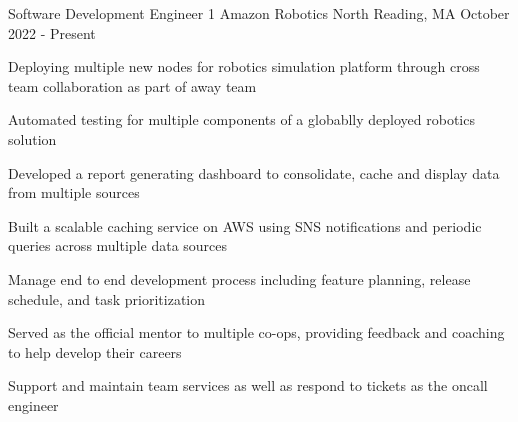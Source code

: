 

\begin{cventries}

  
	\cventry
	{Software Development Engineer 1}
	{Amazon Robotics}
	{North Reading, MA}
	{October 2022 - Present}
	{\begin{cvitems}
		\item {Deploying multiple new nodes for robotics simulation platform through cross team collaboration as part of away team}
		\item {Automated testing for multiple components of a globablly deployed robotics solution}
		\item {Developed a report generating dashboard to consolidate, cache and display data from multiple sources}
		\item {Built a scalable caching service on AWS using SNS notifications and periodic queries across multiple data sources}
		\item {Manage end to end development process including feature planning, release schedule, and task prioritization}
		\item {Served as the official mentor to multiple co-ops, providing feedback and coaching to help develop their careers}
		\item {Support and maintain team services as well as respond to tickets as the oncall engineer}
		\end{cvitems}}
  

\end{cventries}
